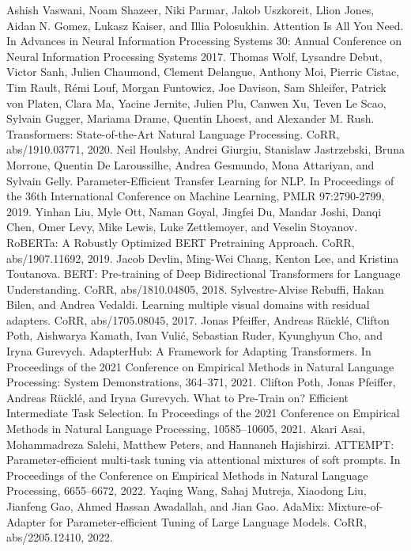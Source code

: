 \documentclass[conference]{IEEEtran}
\begin{document}
\begin{thebibliography}{00}
 Ashish Vaswani, Noam Shazeer, Niki Parmar, Jakob Uszkoreit, Llion Jones, Aidan N. Gomez, Lukasz Kaiser, and Illia Polosukhin. Attention Is All You Need. In Advances in Neural Information Processing Systems 30: Annual Conference on Neural Information Processing Systems 2017.
 Thomas Wolf, Lysandre Debut, Victor Sanh, Julien Chaumond, Clement Delangue, Anthony Moi, Pierric Cistac, Tim Rault, Rémi Louf, Morgan Funtowicz, Joe Davison, Sam Shleifer, Patrick von Platen, Clara Ma, Yacine Jernite, Julien Plu, Canwen Xu, Teven Le Scao, Sylvain Gugger, Mariama Drame, Quentin Lhoest, and Alexander M. Rush. Transformers: State-of-the-Art Natural Language Processing. CoRR, abs/1910.03771, 2020.
 Neil Houlsby, Andrei Giurgiu, Stanislaw Jastrzebski, Bruna Morrone, Quentin De Laroussilhe, Andrea Gesmundo, Mona Attariyan, and Sylvain Gelly. Parameter-Efficient Transfer Learning for NLP. In Proceedings of the 36th International Conference on Machine Learning, PMLR 97:2790-2799, 2019.
 Yinhan Liu, Myle Ott, Naman Goyal, Jingfei Du, Mandar Joshi, Danqi Chen, Omer Levy, Mike Lewis, Luke Zettlemoyer, and Veselin Stoyanov. RoBERTa: A Robustly Optimized BERT Pretraining Approach. CoRR, abs/1907.11692, 2019.
 Jacob Devlin, Ming-Wei Chang, Kenton Lee, and Kristina Toutanova. BERT: Pre-training of Deep Bidirectional Transformers for Language Understanding. CoRR, abs/1810.04805, 2018.
 Sylvestre-Alvise Rebuffi, Hakan Bilen, and Andrea Vedaldi. Learning multiple visual domains with residual adapters. CoRR, abs/1705.08045, 2017.
 Jonas Pfeiffer, Andreas Rücklé, Clifton Poth, Aishwarya Kamath, Ivan Vulić, Sebastian Ruder, Kyunghyun Cho, and Iryna Gurevych. AdapterHub: A Framework for Adapting Transformers. In Proceedings of the 2021 Conference on Empirical Methods in Natural Language Processing: System Demonstrations, 364–371, 2021.
 Clifton Poth, Jonas Pfeiffer, Andreas Rücklé, and Iryna Gurevych. What to Pre-Train on? Efficient Intermediate Task Selection. In Proceedings of the 2021 Conference on Empirical Methods in Natural Language Processing, 10585–10605, 2021.
 Akari Asai, Mohammadreza Salehi, Matthew Peters, and Hannaneh Hajishirzi. ATTEMPT: Parameter-efficient multi-task tuning via attentional mixtures of soft prompts. In Proceedings of the Conference on Empirical Methods in Natural Language Processing, 6655–6672, 2022.
 Yaqing Wang, Sahaj Mutreja, Xiaodong Liu, Jianfeng Gao, Ahmed Hassan Awadallah, and Jian Gao. AdaMix: Mixture-of-Adapter for Parameter-efficient Tuning of Large Language Models. CoRR, abs/2205.12410, 2022.

\end{thebibliography}
\end{document}
